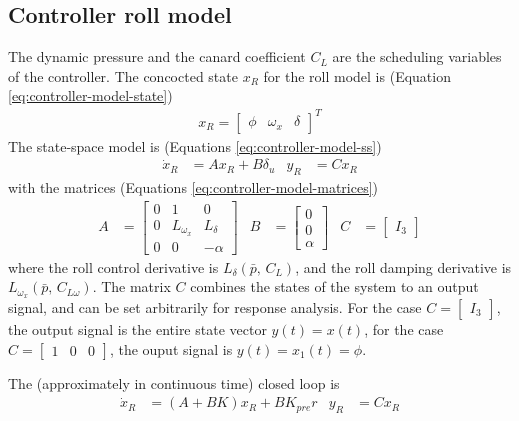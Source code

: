 \subsection{Controller roll model}
\label{sec:controller_model}
The dynamic pressure and the canard coefficient $C_L$ are the scheduling variables of the controller.
The concocted state $x_R$ for the roll model is (Equation \ref{eq:controller-model-state})
\begin{align}
    x_R = \begin{bmatrix} \phi & \omega_x & \delta \end{bmatrix}^T
    \nonumber
\end{align}
The state-space model is (Equations \ref{eq:controller-model-ss})
\begin{align}
    \dot x_R &= A x_R + B \delta_u 
    &
    y_R &= C x_R
    \nonumber
\end{align}
with the matrices (Equations \ref{eq:controller-model-matrices})
\begin{align}    
    A &= \begin{bmatrix}
        0 & 1 & 0 \\
        0 & L_{\omega_x} & L_\delta \\
        0 & 0 & -\alpha
    \end{bmatrix}
    &
    B &= \begin{bmatrix}
        0 \\ 0 \\ \alpha
    \end{bmatrix}
    &
    C &= \begin{bmatrix} I_3 \end{bmatrix}
    \nonumber
\end{align}
where the roll control derivative is $L_\delta (\bar p,  \,  C_L)$, and the roll damping derivative is $L_{\omega_x} (\bar p, \, C_{L \omega})$.
The matrix $C$ combines the states of the system to an output signal, and can be set arbitrarily for response analysis.
For the case $C = \begin{bmatrix} I_3 \end{bmatrix}$, the output signal is the entire state vector $y(t) = x(t)$, for the case $C = \begin{bmatrix} 1 & 0 & 0 \end{bmatrix}$, the ouput signal is $y(t) = x_1(t) = \phi$.

The (approximately in continuous time) closed loop is 
\begin{align}
    \dot x_R &= (A+BK) x_R + B K_{pre} r & y_R &= C x_R
    \label{eq:controller-closedloop}
\end{align}

